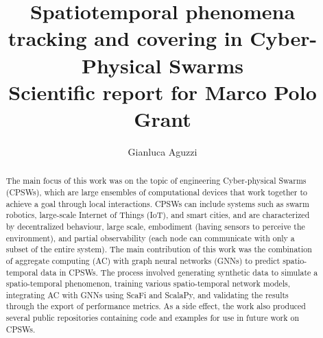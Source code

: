 \documentclass{article}
\title{
Spatiotemporal phenomena tracking and covering in Cyber-Physical Swarms \\[10pt]
\large Scientific report for Marco Polo Grant
}
\author{Gianluca Aguzzi
}
\begin{document}
\maketitle

\begin{abstract}
The main focus of this work was on the topic of engineering Cyber-physical Swarms (CPSWs), which are large ensembles of computational devices that work together to achieve a goal through local interactions. CPSWs can include systems such as swarm robotics, large-scale Internet of Things (IoT), and smart cities, and are characterized by decentralized behaviour, large scale, embodiment (having sensors to perceive the environment), and partial observability (each node can communicate with only a subset of the entire system). The main contribution of this work was the combination of aggregate computing (AC) with graph neural networks (GNNs) to predict spatio-temporal data in CPSWs. The process involved generating synthetic data to simulate a spatio-temporal phenomenon, training various spatio-temporal network models, integrating AC with GNNs using ScaFi and ScalaPy, and validating the results through the export of performance metrics. As a side effect, the work also produced several public repositories containing code and examples for use in future work on CPSWs.
\end{abstract}
\end{document}
